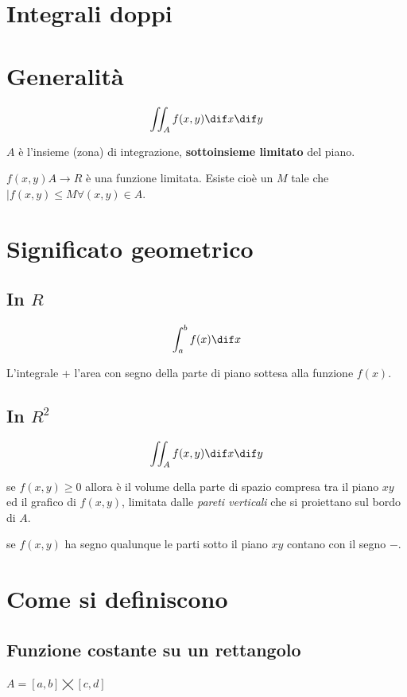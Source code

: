 \section{Integrali doppi}

\section{Generalità}

$$\iint_A f(x,y) \dif x \dif y$$

$A$ è l'insieme (zona) di integrazione, \textbf{sottoinsieme limitato} del piano.

$f(x,y) A\to R$ è una funzione limitata. Esiste cioè un $M$ tale che $|f(x,y) \leq M \forall (x,y) \in A$.

\section{Significato geometrico}

\subsection{In $R$}

$$\int_a^b f(x) \dif x$$

L'integrale + l'area con segno della parte di piano sottesa alla funzione $f(x)$.

\subsection{In $R^2$}

$$\iint_A f(x,y) \dif x \dif y$$

se $f(x,y) \ge 0$ allora è il volume della parte di spazio compresa tra il piano $xy$ ed il grafico di $f(x,y)$, limitata dalle \textit{pareti verticali} che si proiettano sul bordo di $A$.

se $f(x,y)$ ha segno qualunque le parti sotto il piano $xy$ contano con il segno $-$.

\section{Come si definiscono}

\subsection{Funzione costante su un rettangolo}

$A= [a,b] \bigtimes [c,d]$

